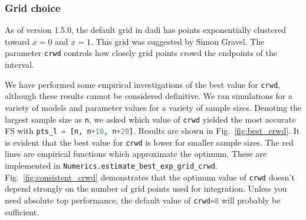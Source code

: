 \documentclass[12pt]{article}
\makeatletter
\newcommand{\dadi}{dadi\xspace}
\newcommand{\py}[1]{\lstinline[language=Python, showstringspaces=False]@#1@}
\makeatother
\begin{document}
\subsubsection{Grid choice}
As of version 1.5.0, the default grid in \dadi has points exponentially clustered toward $x=0$ and $x=1$.
This grid was suggested by Simon Gravel.
The parameter \py{crwd} controls how closely grid points crowd the endpoints of the interval.

We have performed some empirical investigations of the best value for \py{crwd}, although these results cannot be considered definitive.
We ran simulations for a variety of models and parameter values for a variety of sample sizes.
Denoting the largest sample size as \py{n}, we asked which value of \py{crwd} yielded the most accurate FS with \py{pts_l = [n, n+10, n+20]}.
Results are shown in Fig.~\ref{fig:best_crwd}.
It is evident that the best value for \py{crwd} is lower for smaller sample sizes.
The red lines are empirical functions which approximate the optimum.
These are implemented in \py{Numerics.estimate_best_exp_grid_crwd}.
Fig.~\ref{fig:consistent_crwd} demonstrates that the optimum value of \py{crwd} doesn't depend strongly on the number of grid points used for integration.
Unless you need absolute top performance, the default value of \py{crwd=8} will probably be sufficient.
\end{document}

